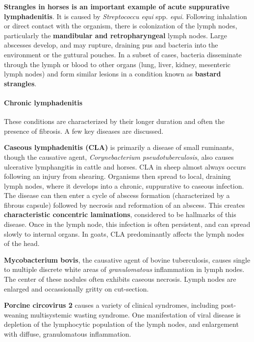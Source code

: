 \documentclass[openany]{article}
\let\oldparagraph\paragraph
\renewcommand{\paragraph}[1]{\oldparagraph{#1}\mbox{}}
\begin{document}
\textbf{Strangles in horses is an important example of acute suppurative
lymphadenitis}. It is caused by \emph{Streptococcu equi} spp.
\emph{equi}. Following inhalation or direct contact with the organism,
there is colonization of the lymph nodes, particularly the
\textbf{mandibular and retropharyngeal} lymph nodes. Large abscesses
develop, and may rupture, draining pus and bacteria into the environment
or the guttural pouches. In a subset of cases, bacteria disseminate
through the lymph or blood to other organs (lung, liver, kidney,
mesenteric lymph nodes) and form similar lesions in a condition known as
\textbf{bastard strangles}.

\paragraph{Chronic lymphadenitis}\label{chronic-lymphadenitis}

These conditions are characterized by their longer duration and often
the presence of fibrosis. A few key diseases are discussed.

\textbf{Caseous lymphadenitis (CLA)} is primarily a disease of small
ruminants, though the causative agent, \emph{Corynebacterium
pseudotuberculosis}, also causes ulcerative lymphangitis in cattle and
horses. CLA in sheep almost always occurs following an injury from
shearing. Organisms then spread to local, draining lymph nodes, where it
develops into a chronic, suppurative to caseous infection. The disease
can then enter a cycle of abscess formation (characterized by a fibrous
capsule) followed by necrosis and reformation of an abscess. This
creates \textbf{characteristic concentric laminations}, considered to be
hallmarks of this disease. Once in the lymph node, this infection is
often persistent, and can spread slowly to internal organs. In goats,
CLA predominantly affects the lymph nodes of the head.

\textbf{Mycobacterium bovis}, the causative agent of bovine
tuberculosis, causes single to multiple discrete white areas of
\emph{granulomatous} inflammation in lymph nodes. The center of these
nodules often exhibits caseous necrosis. Lymph nodes are enlarged and
occassionally gritty on cut-section.

\textbf{Porcine circovirus 2} causes a variety of clinical syndromes,
including post-weaning multisystemic wasting syndrome. One manifestation
of viral disease is depletion of the lymphocytic population of the lymph
nodes, and enlargement with diffuse, granulomatous inflammation.
\end{document}
